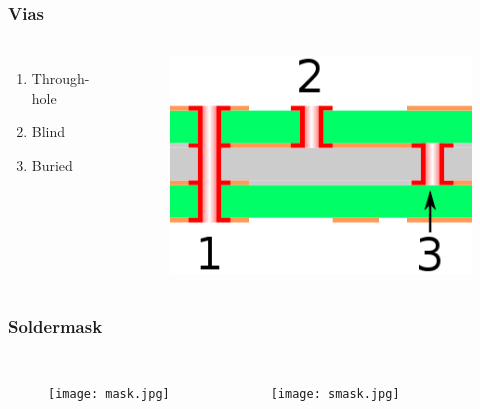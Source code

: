 \documentclass{beamer}
\begin{document}
\begin{frame}
\frametitle{Vias}
\begin{columns}[c] %

\begin{enumerate}
\item Through-hole
\item Blind
\item Buried
\end{enumerate}

\begin{figure}
\includegraphics[width=0.8\linewidth]{vias.png}
\end{figure}

\end{columns}
\end{frame}


\begin{frame}
\frametitle{Soldermask}
\begin{columns}[c] %

\begin{figure}
\texttt{[image: mask.jpg]}
\end{figure}

\begin{figure}
\texttt{[image: smask.jpg]}
\end{figure}

\end{columns}
\end{frame}
\end{document}
